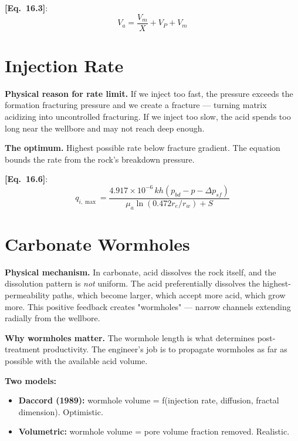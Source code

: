 \documentclass[11pt,a4paper,openany]{book}
\newcommand{\eqrefbook}[1]{\textcolor{blue!60!black}{\textbf{[Eq.~#1]}}}
\begin{document}
\eqrefbook{16.3}:
\begin{equation}
  V_a = \frac{V_m}{X} + V_P + V_m
\end{equation}

\section{Injection Rate}

\begin{theory}
\textbf{Physical reason for rate limit.} If we inject too fast, the
pressure exceeds the formation fracturing pressure and we create a
fracture — turning matrix acidizing into uncontrolled fracturing.
If we inject too slow, the acid spends too long near the wellbore and
may not reach deep enough.

\textbf{The optimum.} Highest possible rate below fracture gradient.
The equation bounds the rate from the rock's breakdown pressure.
\end{theory}

\eqrefbook{16.6}:
\begin{equation}
  q_{i,\max} = \frac{4.917\times 10^{-6}\,kh(p_{bd} - p - \Delta p_{sf})}
  {\mu_a\ln(0.472 r_e/r_w) + S}
\end{equation}

\section{Carbonate Wormholes}

\begin{theory}
\textbf{Physical mechanism.} In carbonate, acid dissolves the rock
itself, and the dissolution pattern is \emph{not} uniform. The acid
preferentially dissolves the highest-permeability paths, which become
larger, which accept more acid, which grow more. This positive feedback
creates "wormholes" — narrow channels extending radially from the
wellbore.

\textbf{Why wormholes matter.} The wormhole length is what determines
post-treatment productivity. The engineer's job is to propagate
wormholes as far as possible with the available acid volume.

\textbf{Two models:}
\begin{itemize}
  \item \textbf{Daccord (1989):} wormhole volume = f(injection rate,
        diffusion, fractal dimension). Optimistic.
  \item \textbf{Volumetric:} wormhole volume = pore volume fraction
        removed. Realistic.
\end{itemize}
\end{theory}
\end{document}
